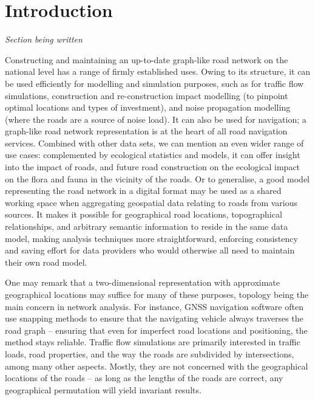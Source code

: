 
\chapter{Introduction}
\label{chap:i}

\textit{Section being written}

Constructing and maintaining an up-to-date graph-like road network on the national level has a range of firmly established uses. Owing to its structure, it can be used efficiently for modelling and simulation purposes, such as for traffic flow simulations, construction and re-construction impact modelling (to pinpoint optimal locations and types of investment), and noise propagation modelling (where the roads are a source of noise load). It can also be used for navigation; a graph-like road network representation is at the heart of all road navigation services. Combined with other data sets, we can mention an even wider range of use cases: complemented by ecological statistics and models, it can offer insight into the impact of roads, and future road construction on the ecological impact on the flora and fauna in the vicinity of the roads. Or to generalise, a good model representing the road network in a digital format may be used as a shared working space when aggregating geospatial data relating to roads from various sources. It makes it possible for geographical road locations, topographical relationships, and arbitrary semantic information to reside in the same data model, making analysis techniques more straightforward, enforcing consistency and saving effort for data providers who would otherwise all need to maintain their own road model.

One may remark that a two-dimensional representation with approximate geographical locations may suffice for many of these purposes, topology being the main concern in network analysis. For instance, GNSS navigation software often use snapping methods to ensure that the navigating vehicle always traverses the road graph – ensuring that even for imperfect road locations and positioning, the method stays reliable. Traffic flow simulations are primarily interested in traffic loads, road properties, and the way the roads are subdivided by intersections, among many other aspects. Mostly, they are not concerned with the geographical locations of the roads – as long as the lengths of the roads are correct, any geographical permutation will yield invariant results.

